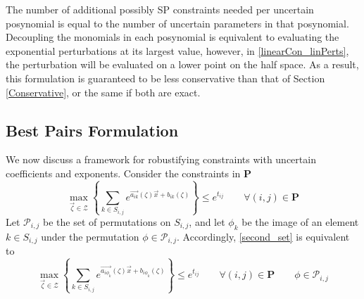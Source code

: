 The number of additional possibly SP constraints needed per uncertain posynomial is equal to the number of uncertain parameters in that posynomial. Decoupling the monomials in each posynomial is equivalent to evaluating the exponential perturbations at its largest value, however, in \eqref{linearCon_linPerts}, the perturbation will be evaluated on a lower point on the half space. As a result, this formulation is guaranteed to be less conservative than that of Section \ref{Conservative}, or the same if both are exact.

\subsection{Best Pairs Formulation}\label{uncertain_exps}
We now discuss a framework for robustifying constraints with uncertain coefficients and exponents. Consider the constraints in $\mathbf{P}$
\begin{equation}
\max_{\vec{\zeta} \in \mathcal{Z}} \left\{\textstyle{\sum}_{k \in S_{i,j}} e^{\vec{a_{ik}}\left(\zeta\right)\vec{x} + b_{ik}\left(\zeta\right)} \right\} \leq e^{t_{ij}} \qquad \forall (i, j) \in \mathbf{P}
\label{second_set}
\end{equation}
Let $\mathcal{P}_{i,j}$ be the set of permutations on $S_{i,j}$, and let $\phi_k$ be the image of an element $k \in S_{i,j}$ under the permutation $\phi \in \mathcal{P}_{i,j}$. Accordingly, \eqref{second_set} is equivalent to  
\begin{equation}
\max_{\vec{\zeta} \in \mathcal{Z}} \left\{\textstyle{\sum}_{k \in S_{i,j}} e^{\vec{a_{i\phi_k}}\left(\zeta\right)\vec{x} + b_{i\phi_k}\left(\zeta\right)} \right\} \leq e^{t_{ij}} \qquad \forall (i, j) \in \mathbf{P} \qquad \phi \in \mathcal{P}_{i,j}
\label{permutation_k_term}
\end{equation}

